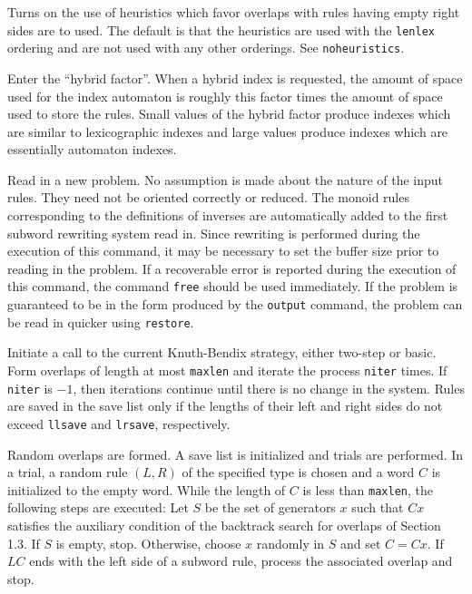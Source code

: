 \nobreak

Turns on the use of heuristics which favor overlaps with rules
having empty right sides are to used.  The default is that the
heuristics are used with the {\tt lenlex} ordering and are not used
with any other orderings.  See {\tt noheuristics}.

\medskip
{}

\nobreak

Enter the ``hybrid factor''.  When a hybrid index is requested, the
amount of space used for the index automaton is roughly this factor
times the amount of space used to store the rules.  Small values of
the hybrid factor produce indexes which are similar to lexicographic
indexes and large values produce indexes which are essentially
automaton indexes.

\medskip
{}

\nobreak

Read in a new problem.  No assumption is made about the nature of the
input rules.  They need not be oriented correctly or reduced.  The
monoid rules corresponding to the definitions of inverses are
automatically added to the first subword rewriting system read in.
Since rewriting is performed during the execution of this command, it
may be necessary to set the buffer size prior to reading in the
problem.  If a recoverable error is reported during the
execution of this command, the command {\tt free} should be used
immediately.  If the problem is guaranteed to be in the form produced
by the {\tt output} command, the problem can be read in quicker using
{\tt restore}.

\medskip
{}

\nobreak

Initiate a call to the current Knuth-Bendix strategy, either two-step
or basic.  Form overlaps of length at most {\tt maxlen} and iterate
the process {\tt niter} times.  If {\tt niter} is $-1$, then
iterations continue until there is no change in the system.  Rules are
saved in the save list only if the lengths of their left and right
sides do not exceed {\tt llsave} and {\tt lrsave}, respectively.

\medskip
{}

\nobreak

Random overlaps are formed.  A save list is initialized and trials are
performed.  In a trial, a random rule $(L,R)$ of the specified type is
chosen and a word $C$ is initialized to the empty word.  While the
length of $C$ is less than {\tt maxlen}, the following steps are
executed:  Let $S$ be the set of generators $x$ such that $Cx$
satisfies the auxiliary condition of the backtrack search for overlaps
of Section 1.3.  If $S$ is empty, stop.  Otherwise, choose $x$
randomly in $S$ and set $C = Cx$.  If $LC$ ends with the left side of
a subword rule, process the associated overlap and stop.

